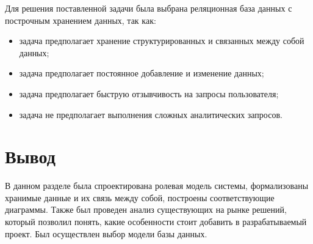 Для решения поставленной задачи была выбрана реляционная база данных с построчным хранением данных, так как:

\begin{itemize}
	\item задача предполагает хранение структурированных и связанных между собой данных;
	\item задача предполагает постоянное добавление и изменение данных;
	\item задача предполагает быструю отзывчивость на запросы пользователя;
	\item задача не предполагает выполнения сложных аналитических запросов.
\end{itemize}

\section*{Вывод}

В данном разделе была спроектирована ролевая модель системы, формализованы хранимые данные и их связь между собой, построены соответствующие диаграммы. Также был проведен анализ существующих на рынке решений, который позволил понять, какие особенности стоит добавить в разрабатываемый проект. Был осуществлен выбор модели базы данных.